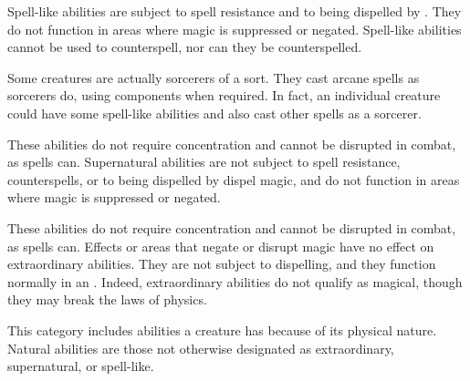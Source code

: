 Spell-like abilities are subject to spell resistance and to being dispelled by . They do not function in areas where magic is suppressed or negated. Spell-like abilities cannot be used to counterspell, nor can they be counterspelled.

Some creatures are actually sorcerers of a sort. They cast arcane spells as sorcerers do, using components when required. In fact, an individual creature could have some spell-like abilities and also cast other spells as a sorcerer.

 These abilities do not require concentration and cannot be disrupted in combat, as spells can. Supernatural abilities are not subject to spell resistance, counterspells, or to being dispelled by dispel magic, and do not function in areas where magic is suppressed or negated.

 These abilities do not require concentration and cannot be disrupted in combat, as spells can. Effects or areas that negate or disrupt magic have no effect on extraordinary abilities. They are not subject to dispelling, and they function normally in an . Indeed, extraordinary abilities do not qualify as magical, though they may break the laws of physics.

 This category includes abilities a creature has because of its physical nature. Natural abilities are those not otherwise designated as extraordinary, supernatural, or spell-like.

